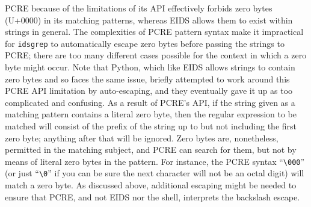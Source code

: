 \documentclass[twocolumn]{report}
\begin{document}
PCRE because of the limitations of its API effectively forbids zero bytes
(U+0000) in its matching patterns, whereas EIDS allows them to exist within
strings in general.  The complexities of PCRE pattern syntax make it
impractical for \texttt{idsgrep} to automatically escape zero bytes before
passing the strings to PCRE; there are too many different cases possible for
the context in which a zero byte might occur.  Note that Python, which like
EIDS allows strings to contain zero bytes and so faces the same issue,
briefly attempted to work around this PCRE API limitation by auto-escaping,
and they eventually gave it up as too complicated and confusing.  As a
result of PCRE's API, if the string given as a matching pattern contains a
literal zero byte, then the regular expression to be matched will consist of
the prefix of the string up to but not including the first zero byte;
anything after that will be ignored.  Zero bytes are, nonetheless, permitted
in the matching subject, and PCRE can search for them, but not by means of
literal zero bytes in the pattern.  For instance, the PCRE syntax
``\texttt{\textbackslash000}'' (or just ``\texttt{\textbackslash0}'' if you
can be sure the next character will not be an octal digit) will match a zero
byte.  As discussed above, additional escaping might be needed to ensure
that PCRE, and not EIDS nor the shell, interprets the backslash escape.


\clearpage
{}



\end{document}
